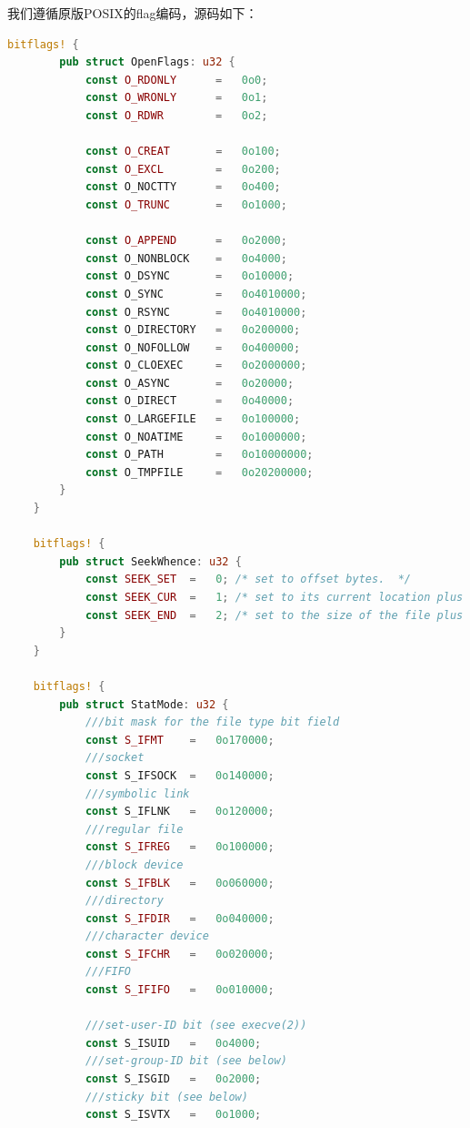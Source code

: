 我们遵循原版POSIX的flag编码，源码如下：
\begin{lstlisting}[language={rust}, label={code:refill}, caption={FileDescriptor}]
    bitflags! {
        pub struct OpenFlags: u32 {
            const O_RDONLY      =   0o0;
            const O_WRONLY      =   0o1;
            const O_RDWR        =   0o2;

            const O_CREAT       =   0o100;
            const O_EXCL        =   0o200;
            const O_NOCTTY      =   0o400;
            const O_TRUNC       =   0o1000;

            const O_APPEND      =   0o2000;
            const O_NONBLOCK    =   0o4000;
            const O_DSYNC       =   0o10000;
            const O_SYNC        =   0o4010000;
            const O_RSYNC       =   0o4010000;
            const O_DIRECTORY   =   0o200000;
            const O_NOFOLLOW    =   0o400000;
            const O_CLOEXEC     =   0o2000000;
            const O_ASYNC       =   0o20000;
            const O_DIRECT      =   0o40000;
            const O_LARGEFILE   =   0o100000;
            const O_NOATIME     =   0o1000000;
            const O_PATH        =   0o10000000;
            const O_TMPFILE     =   0o20200000;
        }
    }

    bitflags! {
        pub struct SeekWhence: u32 {
            const SEEK_SET  =   0; /* set to offset bytes.  */
            const SEEK_CUR  =   1; /* set to its current location plus offset bytes.  */
            const SEEK_END  =   2; /* set to the size of the file plus offset bytes.  */
        }
    }

    bitflags! {
        pub struct StatMode: u32 {
            ///bit mask for the file type bit field
            const S_IFMT    =   0o170000;
            ///socket
            const S_IFSOCK  =   0o140000;
            ///symbolic link
            const S_IFLNK   =   0o120000;
            ///regular file
            const S_IFREG   =   0o100000;
            ///block device
            const S_IFBLK   =   0o060000;
            ///directory
            const S_IFDIR   =   0o040000;
            ///character device
            const S_IFCHR   =   0o020000;
            ///FIFO
            const S_IFIFO   =   0o010000;

            ///set-user-ID bit (see execve(2))
            const S_ISUID   =   0o4000;
            ///set-group-ID bit (see below)
            const S_ISGID   =   0o2000;
            ///sticky bit (see below)
            const S_ISVTX   =   0o1000;


\end{lstlisting}
